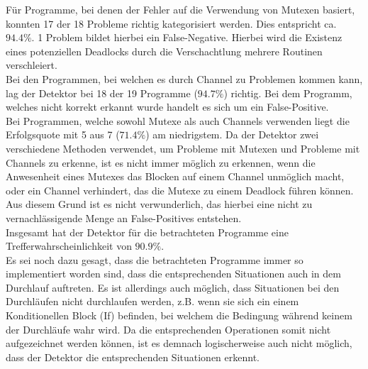 Für Programme, bei denen der Fehler auf die Verwendung von Mutexen 
basiert, konnten 17 der 18 Probleme richtig kategorisiert werden. 
Dies entspricht ca. $94.4\%$. 1 Problem bildet hierbei ein False-Negative.
Hierbei wird die Existenz eines potenziellen Deadlocks durch die 
Verschachtlung mehrere Routinen verschleiert.\\
Bei den Programmen, bei welchen es durch Channel zu Problemen kommen kann, 
lag der Detektor bei 18 der 19 Programme ($94.7\%$) richtig. Bei dem 
Programm, welches nicht korrekt erkannt wurde handelt es sich um ein False-Positive.\\
Bei Programmen, welche sowohl Mutexe als auch Channels verwenden liegt 
die Erfolgsquote mit 5 aus 7 ($71.4\%$) am niedrigstem. Da der Detektor 
zwei verschiedene Methoden verwendet, um Probleme mit Mutexen und Probleme 
mit Channels zu erkenne, ist es nicht immer möglich zu erkennen, wenn die 
Anwesenheit eines Mutexes das Blocken auf einem Channel unmöglich macht, 
oder ein Channel verhindert, das die Mutexe zu einem Deadlock führen können.
Aus diesem Grund ist es nicht verwunderlich, das hierbei eine nicht
zu vernachlässigende Menge an False-Positives entstehen. \\
Insgesamt hat der Detektor für die betrachteten Programme eine 
Trefferwahrscheinlichkeit von $90.9\%$. \\
Es sei noch dazu gesagt, dass die betrachteten Programme immer so implementiert 
worden sind, dass die entsprechenden Situationen auch in dem Durchlauf 
auftreten. Es ist allerdings auch möglich, dass Situationen bei den Durchläufen 
nicht durchlaufen werden, z.B. wenn sie sich ein einem Konditionellen 
Block (If) befinden, bei welchem die Bedingung während keinem der Durchläufe 
wahr wird. Da die entsprechenden Operationen somit nicht aufgezeichnet 
werden können, ist es demnach logischerweise auch nicht möglich, dass der 
Detektor die entsprechenden Situationen erkennt.




